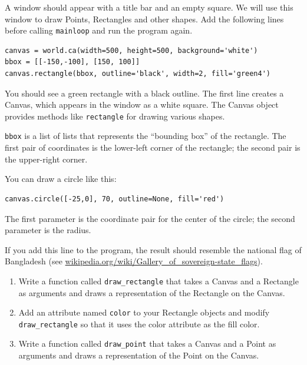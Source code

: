 \documentclass[10pt]{book}
\begin{document}
{\begin{ex}
A window should appear with a title bar and an empty square.
We will use this window to draw Points,
Rectangles and other shapes.  
Add the following lines before calling
\verb"mainloop" and run the program again.


\beforeverb
\begin{verbatim}
canvas = world.ca(width=500, height=500, background='white')
bbox = [[-150,-100], [150, 100]]
canvas.rectangle(bbox, outline='black', width=2, fill='green4')
\end{verbatim}
\afterverb

You should see a green rectangle with a black outline.
The first line creates a Canvas, which appears in the window
as a white square.  The Canvas object provides methods like
{\tt rectangle} for drawing various shapes.


{\tt bbox} is a list of lists that represents the ``bounding box''
of the rectangle.  The first pair of coordinates is the lower-left
corner of the rectangle; the second pair is the upper-right corner.

You can draw a circle like this:

\beforeverb
\begin{verbatim}
canvas.circle([-25,0], 70, outline=None, fill='red')
\end{verbatim}
\afterverb


The first parameter is the coordinate pair for the center of the
circle; the second parameter is the radius.

If you add this line to the program, 
the result should resemble the national flag of Bangladesh
(see \url{wikipedia.org/wiki/Gallery_of_sovereign-state_flags}).

\begin{enumerate}

\item Write a function called \verb"draw_rectangle" that takes a
  Canvas and a Rectangle as arguments and draws a
  representation of the Rectangle on the Canvas.

\item Add an attribute named {\tt color} to your Rectangle objects and
  modify \verb"draw_rectangle" so that it uses the color attribute as
  the fill color.

\item Write a function called \verb"draw_point" that takes a
  Canvas and a Point as arguments and draws a
  representation of the Point on the Canvas.


\end{enumerate}
\end{ex}}
\end{document}

